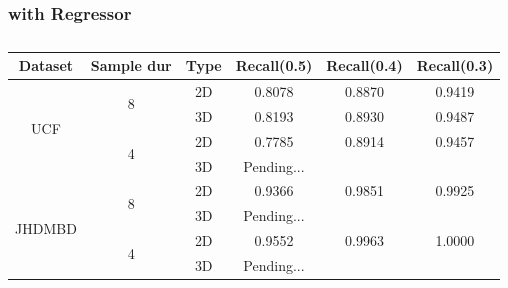\subsubsection{with Regressor}                                             

\begin{table}[h]
  \centering
  \begin{tabular}{|c | c | c || c c c|}
    \hline
    \textbf{Dataset} & \textbf{Sample dur} & \textbf{Type} & \textbf{Recall(0.5)} &  \textbf{Recall(0.4)} &  \textbf{Recall(0.3)} \\
    \hline
    \multirow{4}{*}{UCF} & \multirow{2}{*}{8} & 2D & 0.8078 & 0.8870 & 0.9419 \\
    \cline{3-6}
    {} & {} & 3D & 0.8193 & 0.8930 & 0.9487 \\
    \cline{2-6}
    {} & \multirow{2}{*}{4}& 2D & 0.7785 & 0.8914 & 0.9457 \\
    \cline{3-6}
    {} & {} & 3D & Pending... \\
    \hline
    \multirow{4}{*}{JHDMBD} & \multirow{2}{*}{8} & 2D &  0.9366 & 0.9851 & 0.9925  \\
    \cline{3-6}
    {} & {} & 3D & Pending... \\
    \cline{2-6}
    {} & \multirow{2}{*}{4}& 2D & 0.9552 & 0.9963 & 1.0000 \\
    \cline{3-6}
    {} & {} & 3D & Pending... \\
    \hline
    
  \end{tabular}
  \caption{}
  \label{table:new_sample_reg}
\end{table}


% 

